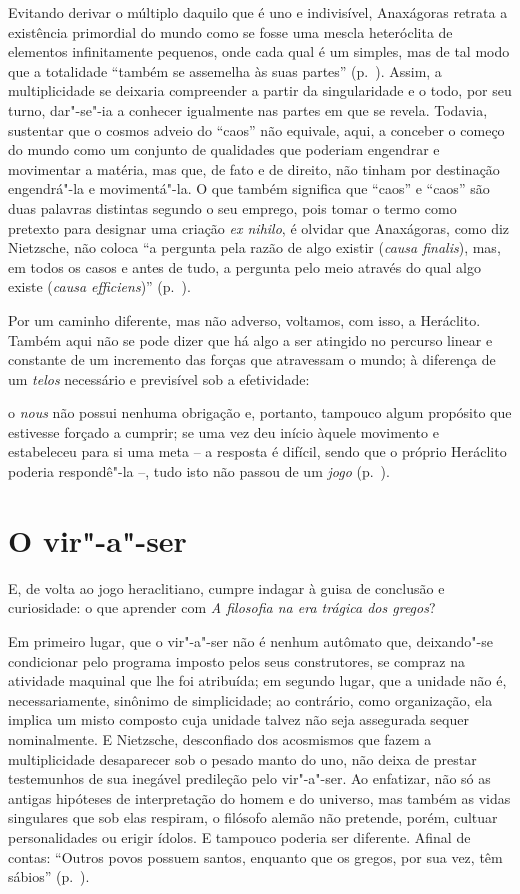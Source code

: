 Evitando derivar o múltiplo daquilo que é uno e indivisível, Anaxágoras
retrata a existência primordial do mundo como se fosse uma mescla
heteróclita de elementos infinitamente pequenos, onde cada qual é um
simples, mas de tal modo que a totalidade ``também se
assemelha às suas partes'' (p.~\pageref{suaspartes}).
Assim, a multiplicidade se deixaria compreender a partir da
singularidade e o todo, por seu turno, dar"-se"-ia a conhecer igualmente
nas partes em que se revela. Todavia, sustentar que o cosmos adveio do
``caos'' não equivale, aqui, a conceber o começo do mundo como um
conjunto de qualidades que poderiam engendrar e movimentar a matéria,
mas que, de fato e de direito, não tinham por destinação engendrá"-la e
movimentá"-la. O que também significa que ``caos'' e ``caos'' são duas
palavras distintas segundo o seu emprego, pois tomar o termo como
pretexto para designar uma criação \textit{ex nihilo}, é olvidar que
Anaxágoras, como diz Nietzsche, não coloca ``a pergunta
pela razão de algo existir (\textit{causa finalis}), mas, em todos os
casos e antes de tudo, a pergunta pelo meio através do qual algo existe
(\textit{causa efficiens})'' (p.~\pageref{causafinalis}).

Por um caminho diferente, mas não adverso, voltamos, com isso, a
Heráclito. Também aqui não se pode dizer que há algo a ser atingido no
percurso linear e constante de um incremento das forças que atravessam
o mundo; à diferença de um \textit{telos} necessário e previsível sob a
efetividade: 

\begin{hedraquote} 
o \textit{nous} não possui nenhuma
obrigação e, portanto, tampouco algum propósito que estivesse forçado a
cumprir; se uma vez deu início àquele movimento e estabeleceu para si
uma meta -- a resposta é difícil, sendo que o próprio Heráclito poderia
respondê"-la --, tudo isto não passou de um
\textit{jogo} (p.~\pageref{naopossuinenhuma}).
\end{hedraquote} 

\section{O vir"-a"-ser}
E, de volta
ao jogo heraclitiano, cumpre indagar à guisa de conclusão e
curiosidade: o que aprender com \textit{A filosofia na era trágica dos
gregos}?

Em primeiro lugar, que o vir"-a"-ser não é nenhum autômato que,
deixando"-se condicionar pelo programa imposto pelos seus construtores,
se compraz na atividade maquinal que lhe foi atribuída; em segundo
lugar, que a unidade não é, necessariamente, sinônimo de simplicidade;
ao contrário, como organização, ela implica um misto composto cuja
unidade talvez não seja assegurada sequer nominalmente. E Nietzsche,
desconfiado dos acosmismos que fazem a multiplicidade desaparecer sob o
pesado manto do uno, não deixa de prestar testemunhos de sua inegável
predileção pelo vir"-a"-ser. Ao enfatizar, não só as antigas hipóteses de
interpretação do homem e do universo, mas também as vidas singulares que sob
elas respiram, o filósofo alemão não pretende, porém, cultuar
personalidades ou erigir ídolos. E tampouco poderia ser diferente.
Afinal de contas: ``Outros povos possuem santos, enquanto
que os gregos, por sua vez, têm sábios'' (p.~\pageref{santos}).
